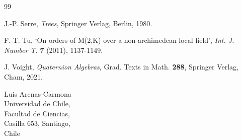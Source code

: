 \documentclass{amsart}
\theoremstyle{definition}
\begin{document}
\begin{thebibliography}{99}








{\sc J.-P. Serre},  {\em Trees}, Springer Verlag, Berlin, 1980.

{\sc F.-T. Tu}, `On orders of M(2,K) over a non-archimedean local field',  {\em Int. J. Number T.} \textbf{7} (2011), 1137-1149.

 {\sc J. Voight}, {\em Quaternion Algebras}, Grad. Texts in Math.
 \textbf{288},
Springer Verlag, Cham, 2021.



\end{thebibliography}

  Luis Arenas-Carmona\\
Universidad de Chile,\\ Facultad de Ciencias, \\Casilla 653, Santiago,\\
   Chile \\
\end{document}

